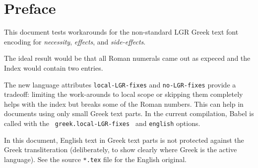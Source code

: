 \documentclass[a4paper,oneside]{book}
\newcommand*{\greeklanguagespecifier}{%
  greek.local-LGR-fixes%
}
\begin{document}
\frontmatter

\tableofcontents

\chapter{Preface \label{ch:preface}}

This document tests workarounds for the non-standard LGR Greek text font
encoding for \emph{necessity}, \emph{effects}, and \emph{side-effects}.

The ideal result would be that all Roman numerals came out as expeced
and the Index would contain two entries.

The new language attributes \texttt{local-LGR-fixes} and
\texttt{no-LGR-fixes} provide a tradeoff: limiting the work-arounds to local
scope or skipping them completely helps with the index but breaks some of
the Roman numbers. This can help in documents using only small Greek text
parts. In the current compilation, Babel is called with the
\texttt{\greeklanguagespecifier} and \texttt{english} options.

In this document, English text in Greek text parts is not protected against
the Greek transliteration (deliberately, to show clearly where Greek is the
active language). See the source \texttt{*.tex} file for the English
original.
\end{document}
